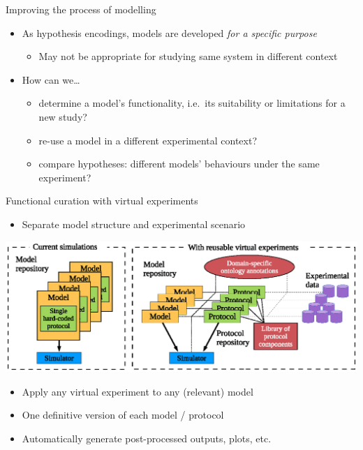 \documentclass[t,xcolor={usenames,dvipsnames}]{beamer}
\newcommand{\subitem}[1]{\begin{itemize}[<.->]\item #1 \end{itemize}}
\begin{document}
\begin{frame}{Improving the process of modelling}
\begin{itemize}
\item As hypothesis encodings, models are developed \emph{for a specific purpose}
  \subitem{May not be appropriate for studying same system in different context}
\item How can we\ldots
  \begin{itemize}
  \item determine a model's functionality, i.e.\ its suitability or limitations for a new study? %
  \item re-use a model in a different experimental context?
  \item compare hypotheses: different models' behaviours under the same experiment?
  \end{itemize}
\end{itemize}
\end{frame}


\begin{frame}{Functional curation with virtual experiments}
\subitem{Separate \alert{model structure} and \alert{experimental scenario}}
\vspace{-.2cm}
\hspace{-1cm}\includegraphics[width=1.185\textwidth]{virtual_expts_schematic}
\vspace{-.31cm}
\begin{itemize}
\item Apply any \alert{virtual experiment} to any (relevant) model
\item One definitive version of each model / protocol
\item Automatically generate post-processed outputs, plots, etc.
\end{itemize}
\end{frame}
\end{document}
